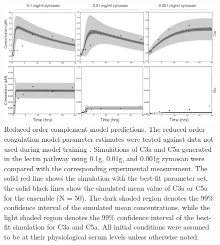\documentclass[12pt]{article}
\begin{document}
\begin{figure}[h]
\centering
\includegraphics[width=1.0\textwidth]{./figs/Figure3_predictions_final_v3.pdf}
\caption{Reduced order complement model predictions. The reduced order coagulation model parameter estimates were tested against data not used during model training \cite{morad2015time}.
Simulations of C3a and C5a generated in the lectin pathway using 0.1g, 0.01g, and 0.001g zymosan were compared with the corresponding experimental measurement.
The solid red line shows the simulation with the best-fit parameter set, the solid black lines show the simulated mean value of C3a or C5a for the ensemble (N = 50).
The dark shaded region denotes the 99\% confidence interval of the simulated mean concentrations, while the light shaded region denotes the 99\%
confidence interval of the best-fit simulation for C3a and C5a. All initial conditions were assumed to be at their physiological serum levels unless otherwise noted.
}\label{fig-prediction}
\end{figure}

\end{document}
